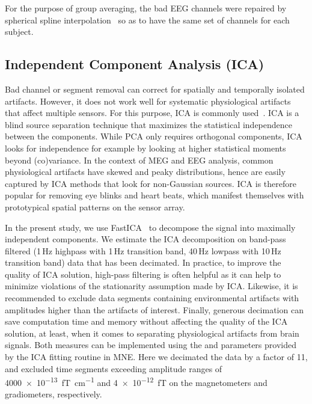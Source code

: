 For the purpose of group averaging, the bad \ac{EEG} channels were repaired by spherical spline interpolation~\citep{perrin1989spherical} so as to have the same set of channels for each subject.

\subsection{Independent Component Analysis (ICA)}
 
Bad channel or segment removal can correct for spatially and temporally isolated artifacts. However, it does not work well for systematic physiological artifacts that affect multiple sensors. For this purpose, \ac{ICA} is commonly used~\citep{jung1998extended}. \ac{ICA} is a blind source separation technique that maximizes the statistical independence between the components. While \ac{PCA} only requires orthogonal components, \ac{ICA} looks for independence for example by looking at higher statistical moments beyond (co)variance. In the context of MEG and EEG analysis, common physiological artifacts have skewed and peaky distributions, hence are easily captured by \ac{ICA} methods that look for non-Gaussian sources. \ac{ICA} is therefore popular for removing eye blinks and heart beats, which manifest themselves with prototypical spatial patterns on the sensor array.

In the present study, we use FastICA~\citep{hyvarinen1999fast} to decompose the signal into maximally independent components. We estimate the ICA decomposition on band-pass filtered (1\,Hz highpass with 1\,Hz transition band, 40\,Hz lowpass with 10\,Hz transition band) data that has been decimated. In practice, to improve the quality of ICA solution, high-pass filtering is often helpful as it can help to minimize violations of the stationarity assumption made by ICA. Likewise, it is recommended to exclude data segments containing environmental artifacts with amplitudes higher than the artifacts of interest. Finally, generous decimation can save computation time and memory without affecting the quality of the ICA solution, at least, when it comes to separating physiological artifacts from brain signals. Both measures can be implemented using the  and  parameters provided by the ICA fitting routine in MNE. Here we decimated the data by a factor of 11, and excluded time segments exceeding amplitude ranges of \SI{4000e-13} {\femto\tesla\per\centi\meter} and \SI{4e-12} {\femto\tesla} on the magnetometers and gradiometers, respectively.

